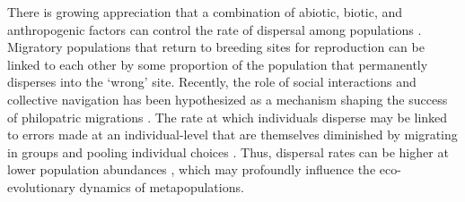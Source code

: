 \documentclass{revtex4}
\begin{document}
There is growing appreciation that a combination of abiotic, biotic, and anthropogenic factors can control the rate of dispersal among populations \citep{Travis:2013en,H:2013fs,Keefer:2014gg,Bett:2017ha}.
Migratory populations that return to breeding sites for reproduction can be linked to each other by some proportion of the population that permanently disperses into the `wrong' site. 
Recently, the role of social interactions and collective navigation has been hypothesized  as a mechanism shaping the success of philopatric migrations \citep{Berdahl:2016dx,HardestyMoore:wg,Berdahl:2017uu}.
The rate at which individuals disperse may be linked to errors made at an individual-level that are themselves diminished by migrating in groups and pooling individual choices \citep{Simons:2004jo,Berdahl:2016dx,Berdahl:2017uu}.
Thus, dispersal rates can be higher at lower population abundances \citep{Berdahl:2014bl}, which may profoundly influence the eco-evolutionary dynamics of metapopulations. 



\end{document}
